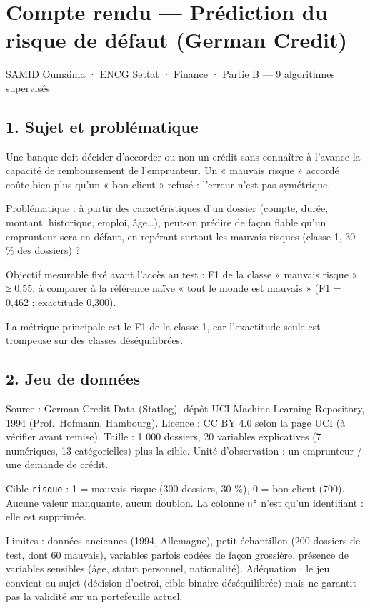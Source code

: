 \documentclass[
]{article}
\author{}
\date{}
\begin{document}
\section{Compte rendu --- Prédiction du risque de défaut (German
Credit)}\label{compte-rendu-pruxe9diction-du-risque-de-duxe9faut-german-credit}

SAMID Oumaima · ENCG Settat · Finance · Partie B --- 9 algorithmes
supervisés

\subsection{1. Sujet et problématique}\label{sujet-et-probluxe9matique}

Une banque doit décider d'accorder ou non un crédit sans connaître à
l'avance la capacité de remboursement de l'emprunteur. Un « mauvais
risque » accordé coûte bien plus qu'un « bon client » refusé : l'erreur
n'est pas symétrique.

Problématique : à partir des caractéristiques d'un dossier (compte,
durée, montant, historique, emploi, âge\ldots), peut-on prédire de façon
fiable qu'un emprunteur sera en défaut, en repérant surtout les mauvais
risques (classe 1, 30 \% des dossiers) ?

Objectif mesurable fixé avant l'accès au test : F1 de la classe «
mauvais risque » ≥ 0,55, à comparer à la référence naïve « tout le monde
est mauvais » (F1 = 0,462 ; exactitude 0,300).

La métrique principale est le F1 de la classe 1, car l'exactitude seule
est trompeuse sur des classes déséquilibrées.

\subsection{2. Jeu de données}\label{jeu-de-donnuxe9es}

Source : German Credit Data (Statlog), dépôt UCI Machine Learning
Repository, 1994 (Prof.~Hofmann, Hambourg). Licence : CC BY 4.0 selon la
page UCI (à vérifier avant remise). Taille : 1 000 dossiers, 20
variables explicatives (7 numériques, 13 catégorielles) plus la cible.
Unité d'observation : un emprunteur / une demande de crédit.

Cible \texttt{risque} : 1 = mauvais risque (300 dossiers, 30 \%), 0 =
bon client (700). Aucune valeur manquante, aucun doublon. La colonne
\texttt{n°} n'est qu'un identifiant : elle est supprimée.

Limites : données anciennes (1994, Allemagne), petit échantillon (200
dossiers de test, dont 60 mauvais), variables parfois codées de façon
grossière, présence de variables sensibles (âge, statut personnel,
nationalité). Adéquation : le jeu convient au sujet (décision d'octroi,
cible binaire déséquilibrée) mais ne garantit pas la validité sur un
portefeuille actuel.
\end{document}
